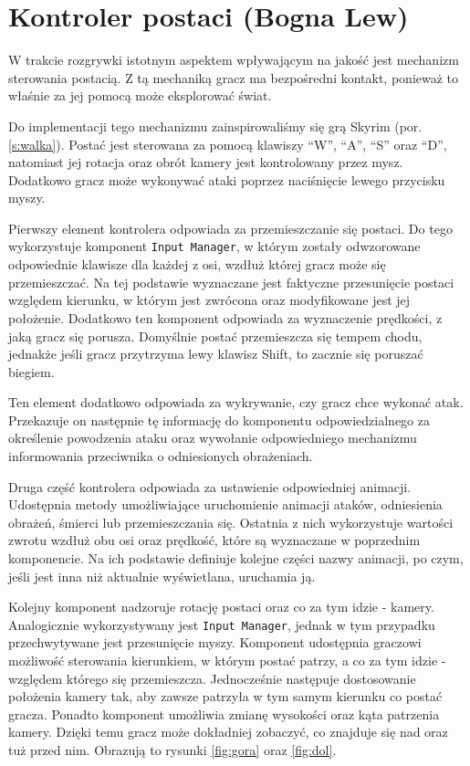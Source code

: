 \section{Kontroler postaci (Bogna Lew)}\label{s:por_impl}
W trakcie rozgrywki istotnym aspektem wpływającym na jakość jest mechanizm sterowania postacią. Z tą mechaniką gracz ma
bezpośredni kontakt, ponieważ to właśnie za jej pomocą może eksplorować świat.

Do implementacji tego mechanizmu zainspirowaliśmy się grą Skyrim (por. \ref{s:walka}). Postać jest sterowana za pomocą klawiszy “W”, “A”, “S”
oraz “D”, natomiast jej rotacja oraz obrót kamery jest kontrolowany przez mysz. Dodatkowo gracz może wykonywać ataki
poprzez naciśnięcie lewego przycisku myszy.

Pierwszy element kontrolera odpowiada za przemieszczanie się postaci. Do tego wykorzystuje komponent \texttt{Input Manager}, w
którym zostały odwzorowane odpowiednie klawisze dla każdej z osi, wzdłuż której gracz może się przemieszczać. Na tej
podstawie wyznaczane jest faktyczne przesunięcie postaci względem kierunku, w którym jest zwrócona oraz modyfikowane
jest jej położenie. Dodatkowo ten komponent odpowiada za wyznaczenie prędkości, z jaką gracz się porusza. Domyślnie
postać przemieszcza się tempem chodu, jednakże jeśli gracz przytrzyma lewy klawisz Shift, to zacznie się poruszać biegiem.

Ten element dodatkowo odpowiada za wykrywanie, czy gracz chce wykonać atak. Przekazuje on następnie tę informację do
komponentu odpowiedzialnego za określenie powodzenia ataku oraz wywołanie odpowiedniego mechanizmu informowania
przeciwnika o odniesionych obrażeniach.

Druga część kontrolera odpowiada za ustawienie odpowiedniej animacji. Udostępnia metody umożliwiające uruchomienie
animacji ataków, odniesienia obrażeń, śmierci lub przemieszczania się. Ostatnia z nich wykorzystuje wartości zwrotu wzdłuż
obu osi oraz prędkość, które są wyznaczane w poprzednim komponencie. Na ich podstawie definiuje kolejne części nazwy
animacji, po czym, jeśli jest inna niż aktualnie wyświetlana, uruchamia ją.

Kolejny komponent nadzoruje rotację postaci oraz co za tym idzie - kamery. Analogicznie wykorzystywany jest \texttt{Input
Manager}, jednak w tym przypadku przechwytywane jest przesunięcie myszy. Komponent udostępnia graczowi możliwość
sterowania kierunkiem, w którym postać patrzy, a co za tym idzie - względem którego się przemieszcza. Jednocześnie
następuje dostosowanie położenia kamery tak, aby zawsze patrzyła w tym samym kierunku co postać gracza. Ponadto
komponent umożliwia zmianę wysokości oraz kąta patrzenia kamery. Dzięki temu gracz może dokładniej zobaczyć,
co znajduje się nad oraz tuż przed nim. Obrazują to rysunki \ref{fig:gora} oraz \ref{fig:dol}.

